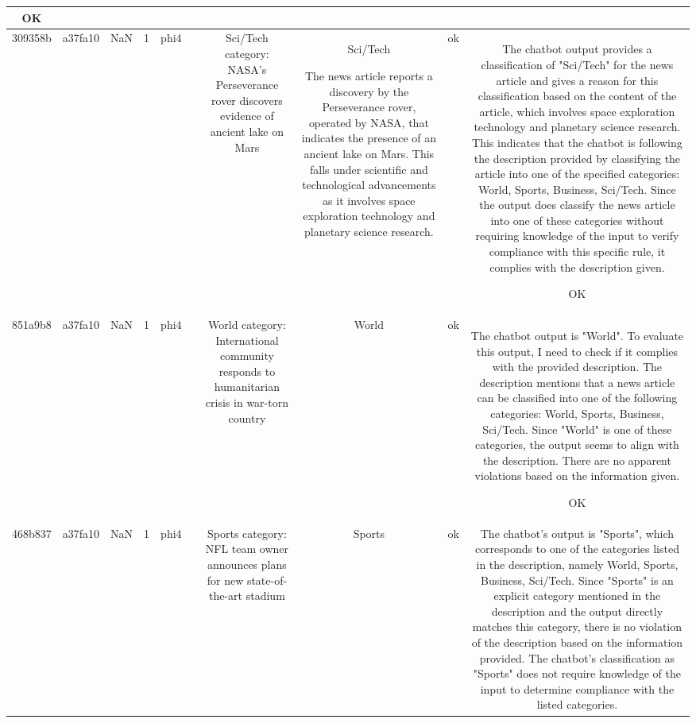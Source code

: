 \begin{table}[h!]
\begin{tabular}{|c|c|c|c|c|c|c|c|c|c|}
OK\\
\hline
309358b & a37fa10 & NaN & 1 & phi4 &  & Sci/Tech category: NASA's Perseverance rover discovers evidence of ancient lake on Mars & Sci/Tech

The news article reports a discovery by the Perseverance rover, operated by NASA, that indicates the presence of an ancient lake on Mars. This falls under scientific and technological advancements as it involves space exploration technology and planetary science research. & ok & The chatbot output provides a classification of "Sci/Tech" for the news article and gives a reason for this classification based on the content of the article, which involves space exploration technology and planetary science research. This indicates that the chatbot is following the description provided by classifying the article into one of the specified categories: World, Sports, Business, Sci/Tech. Since the output does classify the news article into one of these categories without requiring knowledge of the input to verify compliance with this specific rule, it complies with the description given.

OK\\
\hline
851a9b8 & a37fa10 & NaN & 1 & phi4 &  & World category: International community responds to humanitarian crisis in war-torn country & World & ok & The chatbot output is "World". To evaluate this output, I need to check if it complies with the provided description. The description mentions that a news article can be classified into one of the following categories: World, Sports, Business, Sci/Tech. Since "World" is one of these categories, the output seems to align with the description. There are no apparent violations based on the information given.

OK\\
\hline
468b837 & a37fa10 & NaN & 1 & phi4 &  & Sports category: NFL team owner announces plans for new state-of-the-art stadium & Sports & ok & The chatbot's output is "Sports", which corresponds to one of the categories listed in the description, namely World, Sports, Business, Sci/Tech. Since "Sports" is an explicit category mentioned in the description and the output directly matches this category, there is no violation of the description based on the information provided. The chatbot's classification as "Sports" does not require knowledge of the input to determine compliance with the listed categories.


\end{tabular}
\end{table}
